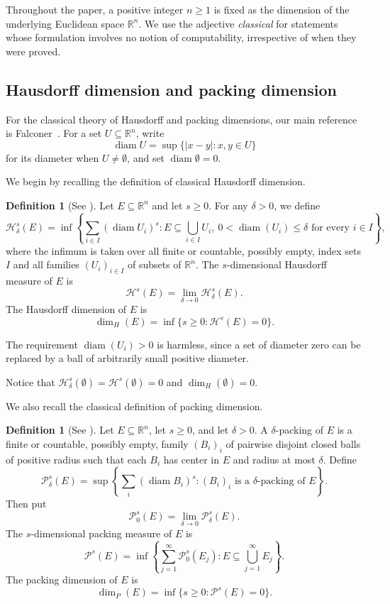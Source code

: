 \documentclass[a4paper,oneside,reqno,12pt]{amsart}
\theoremstyle{plain}
\theoremstyle{definition}
\newtheorem{definition}[theorem]{Definition}
\theoremstyle{remark}
\DeclareMathOperator{\diam}{diam}
\begin{document}
Throughout the paper, a positive integer \(n\ge1\) is fixed as the dimension
of the underlying Euclidean space $\mathbb{R}^n$.
We use the adjective
\emph{classical} for statements whose formulation involves no notion of
computability, irrespective of when they were proved.

\subsection{Hausdorff dimension and packing dimension}

For the classical theory of Hausdorff and packing dimensions, our main
reference is Falconer~\cite{Falconer2014}.
For a set \(U\subseteq\mathbb R^n\), write
\[
\diam U=\sup\{|x-y|:x,y\in U\}
\]
for its diameter when \(U\ne\emptyset\), and set \(\diam\emptyset=0\).

We begin by recalling the definition of classical Hausdorff dimension.

\begin{definition}[{See \cite[Subsections~3.1--3.2]{Falconer2014}}]
\label{def:hausdorff-dimension}
Let \(E \subseteq \mathbb R^n\) and let \(s \ge 0\).
For any \(\delta > 0\), we define
\[
\mathcal H^s_\delta(E)
=
\inf
\left\{
\sum_{i\in I} (\diam U_i)^s
:
E \subseteq \bigcup_{i\in I} U_i,
\ 0<\diam(U_i) \le \delta
\text{ for every } i\in I
\right\},
\]
where the infimum is taken over all finite or countable, possibly empty, index
sets \(I\) and all families \((U_i)_{i\in I}\) of subsets of \(\mathbb{R}^n\).
The \(s\)-dimensional Hausdorff measure of \(E\) is
\[
\mathcal H^s(E)
=
\lim_{\delta\to0}
\mathcal H^s_\delta(E).
\]
The Hausdorff dimension of \(E\) is
\[
\dim_H(E)
=
\inf\{s\ge0:\mathcal H^s(E)=0\}.
\]
\end{definition}

The requirement \(\diam(U_i)>0\) is harmless, since a set of diameter zero can
be replaced by a ball of arbitrarily small positive diameter.

Notice that \(\mathcal H^s_\delta(\emptyset)=\mathcal{H}^s(\emptyset)=0\)
and \(\dim_H(\emptyset)=0.\)


We also recall the classical definition of packing dimension.

\begin{definition}[{See \cite[Subsection~3.5]{Falconer2014}}]
\label{def:packing-dimension}
Let \(E\subseteq\mathbb R^n\), let \(s\ge0\), and let \(\delta>0\).
A \(\delta\)-packing of \(E\) is a finite or countable, possibly empty, family \((B_i)_i\) of pairwise
disjoint closed balls of positive radius such that each \(B_i\) has center in \(E\) and
radius at most \(\delta\).  Define
\[
\mathcal P^s_\delta(E)
=
\sup
\left\{
\sum_i (\diam B_i)^s:
(B_i)_i \text{ is a }\delta\text{-packing of }E
\right\}.
\]
Then put
\[
\mathcal P^s_0(E)
=
\lim_{\delta\to0}\mathcal P^s_\delta(E).
\]
The \(s\)-dimensional packing measure of \(E\) is
\[
\mathcal P^s(E)
=
\inf
\left\{
\sum_{j=1}^\infty \mathcal P^s_0(E_j):
E\subseteq\bigcup_{j=1}^\infty E_j
\right\}.
\]
The packing dimension of \(E\) is
\[
\dim_P(E)
=
\inf\{s\ge0:\mathcal P^s(E)=0\}.
\]
\end{definition}
\end{document}
